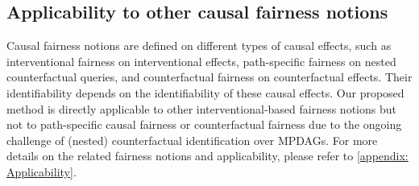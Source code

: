 \documentclass{article} %
\begin{document}




\subsection{Applicability to other causal fairness notions}

Causal fairness notions are defined on different types of causal effects, such as interventional fairness on interventional effects, path-specific fairness on nested counterfactual queries, and counterfactual fairness on counterfactual effects. Their identifiability depends on the identifiability of these causal effects. 
Our proposed method is directly applicable to other interventional-based fairness notions but not to path-specific causal fairness or counterfactual fairness due to the ongoing challenge of (nested) counterfactual identification over MPDAGs. For more details on the related fairness notions and applicability, please refer to \cref{appendix: Applicability}.
\end{document}
